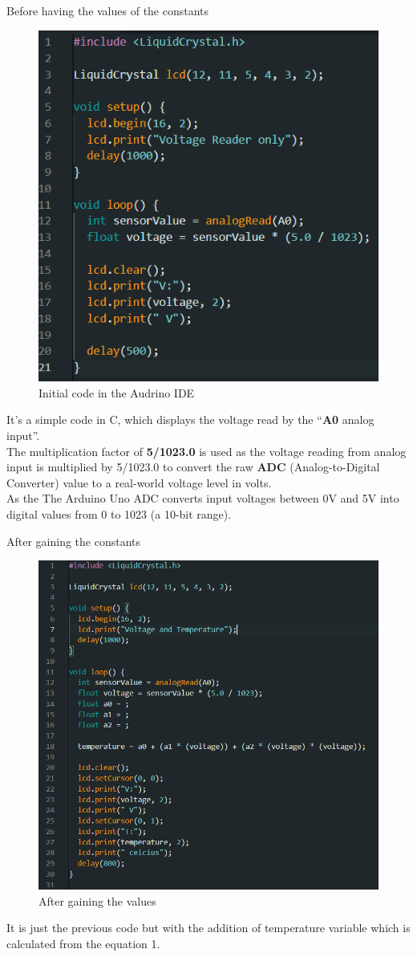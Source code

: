 \documentclass{article}
\begin{document}
\newpage

\begin{center}
    Before having the values of the constants
\end{center}
\begin{figure}[ht]
    \centering
    \includegraphics[width=0.6\linewidth]{image.png}
    \caption{Initial code in the Audrino IDE}
\end{figure}
It’s a simple code in C, which displays the voltage read by the “\textbf{A0} analog input”.\\
The multiplication factor of \textbf{5/1023.0} is used as the voltage reading from analog input is multiplied by 5/1023.0 to convert the raw \textbf{ADC} (Analog-to-Digital Converter) value to a real-world voltage level in volts. \\
As the The Arduino Uno ADC converts input voltages between 0V and 5V into digital values from 0 to 1023 (a 10-bit range).

\newpage

\begin{center}
    After gaining the constants
\end{center}

\begin{figure}
    \centering
    \includegraphics[width=0.5\linewidth]{image1.png}
    \caption{After gaining the values}
\end{figure}
It is just the previous code but with the addition of temperature variable which is calculated from the equation {1}.
\end{document}
